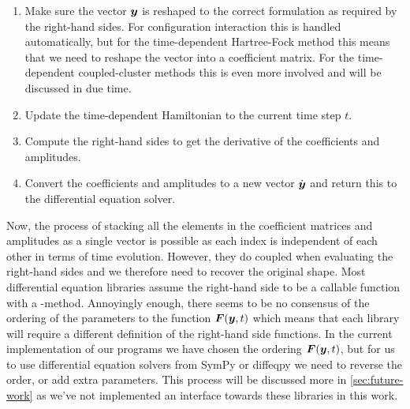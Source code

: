             \begin{enumerate}
                \item Make sure the vector $\boldsymbol{y}$ is reshaped to the correct
                    formulation as required by the right-hand sides.
                    For configuration interaction this is handled automatically,
                    but for the time-dependent Hartree-Fock method this means
                    that we need to reshape the vector into a coefficient
                    matrix.
                    For the time-dependent coupled-cluster methods this is even
                    more involved and will be discussed in due time.
                \item Update the time-dependent Hamiltonian to the current time
                    step $t$.
                \item Compute the right-hand sides to get the derivative of the
                    coefficients and amplitudes.
                \item Convert the coefficients and amplitudes to a new vector
                    $\dot{\boldsymbol{y}}$ and return this to the differential
                    equation solver.
            \end{enumerate}
            Now, the process of stacking all the elements in the coefficient
            matrices and amplitudes as a single vector is possible as each index
            is independent of each other in terms of time evolution.
            However, they do coupled when evaluating the right-hand sides and we
            therefore need to recover the original shape.
            Most differential equation libraries \cite{sympy} \cite{julia-diff}
            assume the right-hand side to be a callable function with a
            -method.
            Annoyingly enough, there seems to be no consensus of the ordering of
            the parameters to the function $\boldsymbol{F}(\boldsymbol{y}, t)$ which means
            that each library will require a different definition of the
            right-hand side functions.
            In the current implementation of our programs we have chosen the
            ordering $\boldsymbol{F}(\boldsymbol{y}, t)$, but for us to use differential
            equation solvers from SymPy \cite{sympy} or diffeqpy
            \cite{julia-diff} we need to reverse the order, or add extra
            parameters.
            This process will be discussed more in \autoref{sec:future-work} as
            we've not implemented an interface towards these libraries in this
            work.

